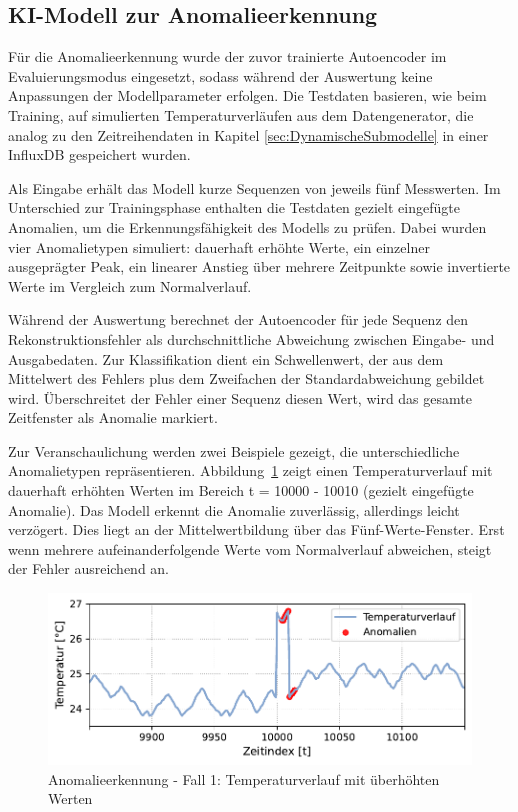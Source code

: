 \newpage
\subsection{KI-Modell zur Anomalieerkennung}

Für die Anomalieerkennung wurde der zuvor trainierte Autoencoder im Evaluierungsmodus eingesetzt, sodass während der Auswertung keine Anpassungen der Modellparameter erfolgen.
Die Testdaten basieren, wie beim Training, auf simulierten Temperaturverläufen aus dem Datengenerator, die analog zu den Zeitreihendaten in Kapitel \ref{sec:DynamischeSubmodelle} in einer InfluxDB gespeichert wurden.

Als Eingabe erhält das Modell kurze Sequenzen von jeweils fünf Messwerten.
Im Unterschied zur Trainingsphase enthalten die Testdaten gezielt eingefügte Anomalien, um die Erkennungsfähigkeit des Modells zu prüfen.
Dabei wurden vier Anomalietypen simuliert: dauerhaft erhöhte Werte, ein einzelner ausgeprägter Peak, ein linearer Anstieg über mehrere Zeitpunkte sowie invertierte Werte im Vergleich zum Normalverlauf.

Während der Auswertung berechnet der Autoencoder für jede Sequenz den Rekonstruktionsfehler als durchschnittliche Abweichung zwischen Eingabe- und Ausgabedaten. 
Zur Klassifikation dient ein Schwellenwert, der aus dem Mittelwert des Fehlers plus dem Zweifachen der Standardabweichung gebildet wird. 
Überschreitet der Fehler einer Sequenz diesen Wert, wird das gesamte Zeitfenster als Anomalie markiert.

Zur Veranschaulichung werden zwei Beispiele gezeigt, die unterschiedliche Anomalietypen repräsentieren. 
Abbildung~\ref{fig:Fall1} zeigt einen Temperaturverlauf mit dauerhaft erhöhten Werten im Bereich t = 10000 - 10010 (gezielt eingefügte Anomalie). 
Das Modell erkennt die Anomalie zuverlässig, allerdings leicht verzögert. 
Dies liegt an der Mittelwertbildung über das Fünf-Werte-Fenster.
Erst wenn mehrere aufeinanderfolgende Werte vom Normalverlauf abweichen, steigt der Fehler ausreichend an.

\vspace{-0.75em}
\begin{figure}[htbp]
    \centering
        \includegraphics[width=1\textwidth]{Bilder/Ergebnisse/KI/Fall1.pdf}
        \vspace{-2em}
    \caption{Anomalieerkennung - Fall 1: Temperaturverlauf mit überhöhten Werten}
    \label{fig:Fall1}
\end{figure}
\vspace{-0.75em}

